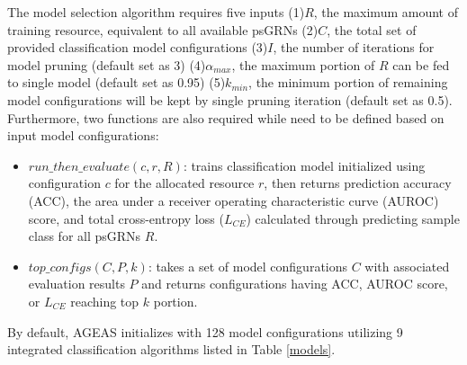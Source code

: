 \documentclass[fleqn,10pt]{wlscirep}
\begin{document}
    The model selection algorithm requires five inputs
    (1)$R$, the maximum amount of training resource, equivalent to all available psGRNs
    (2)$C$, the total set of provided classification model configurations
    (3)$I$, the number of iterations for model pruning (default set as 3)
    (4)$\alpha_{max}$, the maximum portion of $R$ can be fed to single model (default set as 0.95)
    (5)$k_{min}$, the minimum portion of remaining model configurations will be kept by single pruning iteration (default set as 0.5).
    Furthermore, two functions are also required while need to be defined based on input model configurations:
    \begin{itemize}
    \setlength\itemsep{0em}
    \item \textbf{$run\_then\_evaluate(c, r, R)$}: trains classification model initialized using configuration $c$ for the allocated resource $r$, then returns prediction accuracy (ACC), the area under a receiver operating characteristic curve (AUROC)\cite{hanley_mcneil_1982} score, and total cross-entropy loss ($L_{CE}$) calculated through predicting sample class for all psGRNs $R$.

    \item \textbf{$top\_configs(C, P, k)$}: takes a set of model configurations $C$ with associated evaluation results $P$ and returns configurations having ACC, AUROC score, or $L_{CE}$ reaching top $k$ portion.
    \end{itemize}

    \noindent By default, AGEAS initializes with 128 model configurations utilizing 9 integrated classification algorithms listed in Table \ref{models}.
\end{document}
